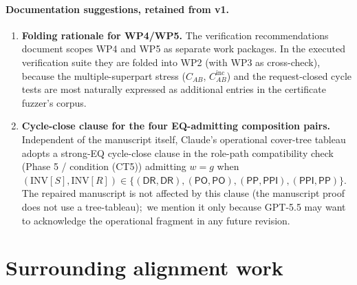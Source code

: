 \documentclass[11pt]{article}
\newcommand{\PP}{\mathsf{PP}}
\newcommand{\PPI}{\mathsf{PPI}}
\newcommand{\PO}{\mathsf{PO}}
\newcommand{\DR}{\mathsf{DR}}
\begin{document}
\paragraph{Documentation suggestions, retained from v1.}
\begin{enumerate}[leftmargin=2em, resume]
  \item \textbf{Folding rationale for WP4/WP5.}  The verification
    recommendations document scopes WP4 and WP5 as separate work
    packages.  In the executed verification suite they are folded
    into WP2 (with WP3 as cross-check), because the
    multiple-superpart stress (\(C_{AB}\), \(C_{AB}^{\mathrm{inc}}\))
    and the request-closed cycle tests are most naturally expressed
    as additional entries in the certificate fuzzer's corpus.
  \item \textbf{Cycle-close clause for the four EQ-admitting
    composition pairs.}  Independent of the manuscript itself,
    Claude's operational cover-tree tableau adopts a strong-EQ
    cycle-close clause in the role-path compatibility check (Phase
    5 / condition (CT5)) admitting \(w = g\) when
    \((\mathrm{INV}[S], \mathrm{INV}[R]) \in
       \{(\DR,\DR), (\PO,\PO), (\PP,\PPI), (\PPI,\PP)\}\).
    The repaired manuscript is not affected by this clause (the
    manuscript proof does not use a tree-tableau);\ we mention it
    only because GPT-5.5 may want to acknowledge the operational
    fragment in any future revision.
\end{enumerate}

\section{Surrounding alignment work}
\end{document}
